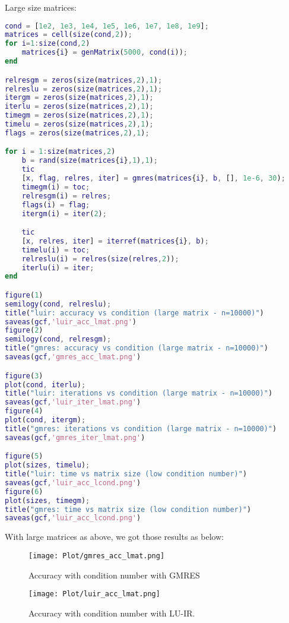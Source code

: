 \clearpage
\newpage
Large size matrices:
\begin{lstlisting}[language=Matlab, caption=Large size matrix]
    cond = [1e2, 1e3, 1e4, 1e5, 1e6, 1e7, 1e8, 1e9];
matrices = cell(size(cond,2));
for i=1:size(cond,2)
    matrices{i} = genMatrix(5000, cond(i));
end

relresgm = zeros(size(matrices,2),1);
relreslu = zeros(size(matrices,2),1);
itergm = zeros(size(matrices,2),1);
iterlu = zeros(size(matrices,2),1);
timegm = zeros(size(matrices,2),1);
timelu = zeros(size(matrices,2),1);
flags = zeros(size(matrices,2),1);

for i = 1:size(matrices,2)
    b = rand(size(matrices{i},1),1);
    tic
    [x, flag, relres, iter] = gmres(matrices{i}, b, [], 1e-6, 30);
    timegm(i) = toc;
    relresgm(i) = relres;
    flags(i) = flag;
    itergm(i) = iter(2);

    tic
    [x, relres, iter] = iterref(matrices{i}, b);
    timelu(i) = toc;
    relreslu(i) = relres(size(relres,2));
    iterlu(i) = iter;
end

figure(1)
semilogy(cond, relreslu);
title("luir: accuracy vs condition (large matrix - n=10000)")
saveas(gcf,'luir_acc_lmat.png')
figure(2)
semilogy(cond, relresgm);
title("gmres: accuracy vs condition (large matrix - n=10000)")
saveas(gcf,'gmres_acc_lmat.png')

figure(3)
plot(cond, iterlu);
title("luir: iterations vs condition (large matrix - n=10000)")
saveas(gcf,'luir_iter_lmat.png')
figure(4)
plot(cond, itergm);
title("gmres: iterations vs condition (large matrix - n=10000)")
saveas(gcf,'gmres_iter_lmat.png')

figure(5)
plot(sizes, timelu);
title("luir: time vs matrix size (low condition number)")
saveas(gcf,'luir_acc_lcond.png')
figure(6)
plot(sizes, timegm);
title("gmres: time vs matrix size (low condition number)")
saveas(gcf,'luir_acc_lcond.png')

\end{lstlisting}
With large matrices as above, we got those results as below:
\begin{figure}[ht]
     \begin{minipage}[b]{0.5\linewidth}
        \centering
   \texttt{[image: Plot/gmres\_acc\_lmat.png]}
        \caption{Accuracy with condition number with GMRES}
        \label{fig:image7}
    \end{minipage}
    \hspace{0.5cm} 
    \begin{minipage}[b]{0.5\linewidth}
        \centering
        \texttt{[image: Plot/luir\_acc\_lmat.png]}
        \caption{Accuracy with condition number with LU-IR.}
        \label{fig:image8}
    \end{minipage}
\end{figure}

